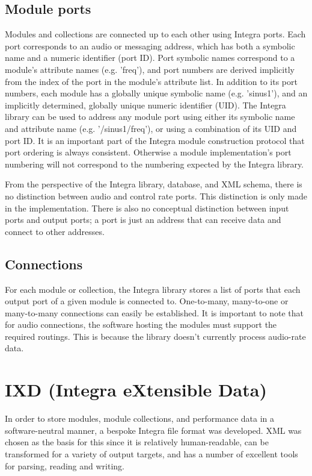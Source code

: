 \documentclass{article}
\begin{document}
\subsection{Module ports}\label{subsec:module_ports} 

Modules and collections are connected up to each other using Integra ports. Each port corresponds to an audio or messaging address, which has both a symbolic name and a numeric identifier (port ID). Port symbolic names correspond to a module's attribute names (e.g. 'freq'), and port numbers are derived implicitly from the index of the port in the module's attribute list. In addition to its port numbers, each module has a globally unique symbolic name (e.g. 'sinus1'), and an implicitly determined, globally unique numeric identifier (UID). The Integra library can be used to address any module port using either its symbolic name and attribute name (e.g. '/sinus1/freq'), or using a combination of its UID and port ID. It is an important part of the Integra module construction protocol that port ordering is always consistent. Otherwise a module implementation's port numbering will not correspond to the numbering expected by the Integra library.

From the perspective of the Integra library, database, and XML schema,
there is no distinction between audio and control rate ports. This
distinction is only made in the implementation. There is also no
conceptual distinction between input ports and output ports; a port is
just an address that can receive data and connect to other addresses.

\subsection{Connections}\label{subsec:connections}

For each module or collection, the Integra library stores a list of ports that each output port of a given module is connected to. One-to-many, many-to-one or many-to-many connections can easily be established. It is important to note that for audio connections, the software hosting the modules must support the required routings. This is because the library doesn't currently process audio-rate data.

\section{IXD (Integra eXtensible Data)}\label{sec:ixd}

In order to store modules, module collections, and performance data in a software-neutral manner, a bespoke Integra file format was developed. XML was chosen as the basis for this since it is relatively human-readable, can be transformed for a variety of output targets, and has a number of excellent tools for parsing, reading and writing. 
\end{document}
